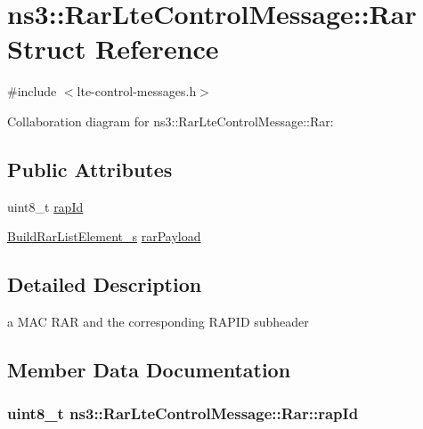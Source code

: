 \hypertarget{structns3_1_1RarLteControlMessage_1_1Rar}{}\section{ns3\+:\+:Rar\+Lte\+Control\+Message\+:\+:Rar Struct Reference}
\label{structns3_1_1RarLteControlMessage_1_1Rar}


{\ttfamily \#include $<$lte-\/control-\/messages.\+h$>$}



Collaboration diagram for ns3\+:\+:Rar\+Lte\+Control\+Message\+:\+:Rar\+:
\subsection*{Public Attributes}
\begin{DoxyCompactItemize}
\item 
uint8\+\_\+t \hyperlink{structns3_1_1RarLteControlMessage_1_1Rar_ac96a142c8ad4770a08e8b241d5dee278}{rap\+Id}
\item 
\hyperlink{structns3_1_1BuildRarListElement__s}{Build\+Rar\+List\+Element\+\_\+s} \hyperlink{structns3_1_1RarLteControlMessage_1_1Rar_a9a2a25a5c301ab73d2ba36cf7b611ce0}{rar\+Payload}
\end{DoxyCompactItemize}


\subsection{Detailed Description}
a M\+AC R\+AR and the corresponding R\+A\+P\+ID subheader 

\subsection{Member Data Documentation}
\subsubsection[{\texorpdfstring{rap\+Id}{rapId}}]{\setlength{\rightskip}{0pt plus 5cm}uint8\+\_\+t ns3\+::\+Rar\+Lte\+Control\+Message\+::\+Rar\+::rap\+Id}\hypertarget{structns3_1_1RarLteControlMessage_1_1Rar_ac96a142c8ad4770a08e8b241d5dee278}{}\label{structns3_1_1RarLteControlMessage_1_1Rar_ac96a142c8ad4770a08e8b241d5dee278}
